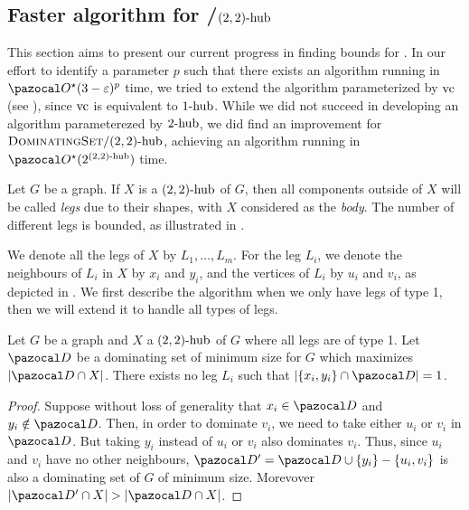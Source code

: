 \subsection{Faster algorithm for /$\sdhub[2,2]$}
\label{section:domset-22hub}

This section aims to present our current progress in finding bounds for . In our effort to identify a parameter $p$ such that there exists an algorithm running in $\O^\star(3 - \varepsilon)^p$ time, we tried to extend the algorithm parameterized by $\vc$ (see ), since $\vc$ is equivalent to $\shub[1]$. While we did not succeed in developing an algorithm parameterezed by $\shub[2]$, we did find an improvement for $\prob{DominatingSet}/\sdhub[2,2]$, achieving an algorithm running in $\O^\star(2^{\sdhub[2,2]})$ time.

\medskip

Let $G$ be a graph. If $X$ is a $\sdhub[2,2]$ of $G$, then all components outside of $X$ will be called \textit{legs} due to their shapes, with $X$ considered as the \textit{body}. The number of different legs is bounded, as illustrated in .



We denote all the legs of $X$ by $L_1, \dots, L_m$. For the leg $L_i$, we denote the neighbours of $L_i$ in $X$ by $x_i$ and $y_i$, and the vertices of $L_i$ by $u_i$ and $v_i$, as depicted in . We first describe the algorithm when we only have legs of type 1, then we will extend it to handle all types of legs.

\begin{lemma}
    \label{lemma:legs}
    Let $G$ be a graph and $X$ a $\sdhub[2,2]$ of $G$ where all legs are of type 1. Let $\D$ be a dominating set of minimum size for $G$ which maximizes $|\D \cap X|$. There exists no leg $L_i$ such that $|\{x_i, y_i\} \cap \D| = 1$.
\end{lemma}

\begin{proof}
    Suppose without loss of generality that $x_i \in \D$ and $y_i \notin \D$. Then, in order to dominate $v_i$, we need to take either $u_i$ or $v_i$ in $\D$. But taking $y_i$ instead of $u_i$ or $v_i$ also dominates $v_i$. Thus, since $u_i$ and $v_i$ have no other neighbours, $\D' = \D \cup \{y_i\} - \{u_i, v_i\}$ is also a dominating set of $G$ of minimum size. Morevover $|\D' \cap X| > |\D \cap X|$.
\end{proof}


